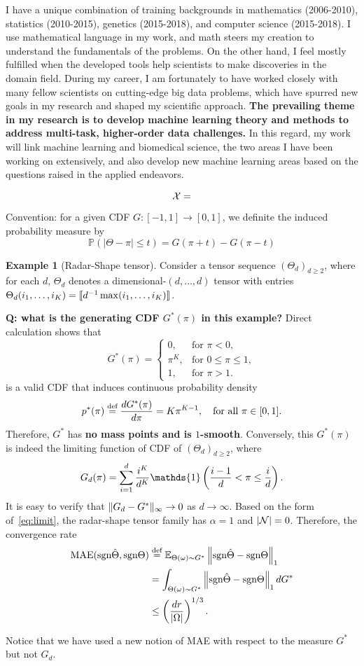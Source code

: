 \documentclass[10pt]{article}
\def\sign{\textup{sgn}}
\theoremstyle{definition}
\theoremstyle{definition}
\newtheorem{example}{Example}
\theoremstyle{definition}
\begin{document}
\begin{enumerate}
I have a unique combination of training backgrounds in mathematics (2006-2010), statistics (2010-2015), genetics (2015-2018), and computer science (2015-2018). I use mathematical language in my work, and math steers my creation to understand the fundamentals of the problems. On the other hand, I feel mostly fulfilled when the developed tools help scientists to make discoveries in the domain field. During my career, I am fortunately to have worked closely with many fellow scientists on cutting-edge big data problems, which have spurred new goals in my research and shaped my scientific approach. {\bf The prevailing theme in my research is to develop machine learning theory and methods to address multi-task, higher-order data challenges.} In this regard, my work will link machine learning and biomedical science, the two areas I have been working on extensively, and also develop new machine learning areas based on the questions raised in the applied endeavors.

\[
\mathcal{X} = 
\]
Convention: for a given CDF $G\colon[-1,1]\to[0,1]$, we definite the induced probability measure by
\[
\mathbb{P}(|\Theta-\pi|\leq t) = G(\pi+t)-G(\pi-t)
\]

\begin{example}[Radar-Shape tensor]
Consider a tensor sequence $(\Theta_d)_{d\geq 2}$, where for each $d$, $\Theta_d$ denotes a dimensional-$(d,\ldots,d)$ tensor with entries $\Theta_d(i_1,\ldots,i_K)=\llbracket d^{-1}\max(i_1,\ldots,i_K) \rrbracket$. 

{\bf Q: what is the generating CDF $G^*(\pi)$ in this example?}
Direct calculation shows that
\begin{equation}\label{eq:limit}
G^*(\pi)=
\begin{cases}
0, &\text{for }\pi< 0,\\
\pi^K, & \text{for }0\leq \pi \leq 1,\\
1, &\text{for }\pi>1.
\end{cases}
\end{equation}
is a valid CDF that induces continuous probability density
\[
p^*(\pi)\stackrel{\text{def}}={dG^*(\pi)\over d\pi} = K\pi^{K-1},\quad \text{for all }\pi\in[0,1].
\]
Therefore, $G^*$ has {\bf no mass points and is $1$-smooth}. Conversely, this $G^*(\pi)$ is indeed the limiting function of CDF of $(\Theta_d)_{d\geq 2}$, where
\[
G_d(\pi)=\sum_{i=1}^d {i^K\over d^K} \mathds{1}\left({i-1\over d}<\pi\leq {i\over d}\right).
\]
It is easy to verify that $\lVert G_d-G^*\rVert_\infty\to 0$ as $d\to \infty$. Based on the form of~\eqref{eq:limit}, the radar-shape tensor family has $\alpha=1$ and $|\mathcal{N}|=0$. Therefore, the convergence rate
\begin{align}
\text{MAE}(\sign \hat \Theta, \sign \Theta)&\stackrel{\text{def}}{=}\mathbb{E}_{\Theta(\omega)\sim G^*}\onenorm{\sign \hat \Theta-\sign \Theta}\\
&=\int_{\Theta(\omega)\sim G^*} \onenorm{\sign \hat \Theta-\sign \Theta} d G^*\\
&\leq \left({dr\over |\Omega|}\right)^{1/3}.
\end{align}
\end{example}
Notice that we have used a new notion of MAE with respect to the measure $G^*$ but not $G_d$. 


\end{enumerate}
\end{document}
